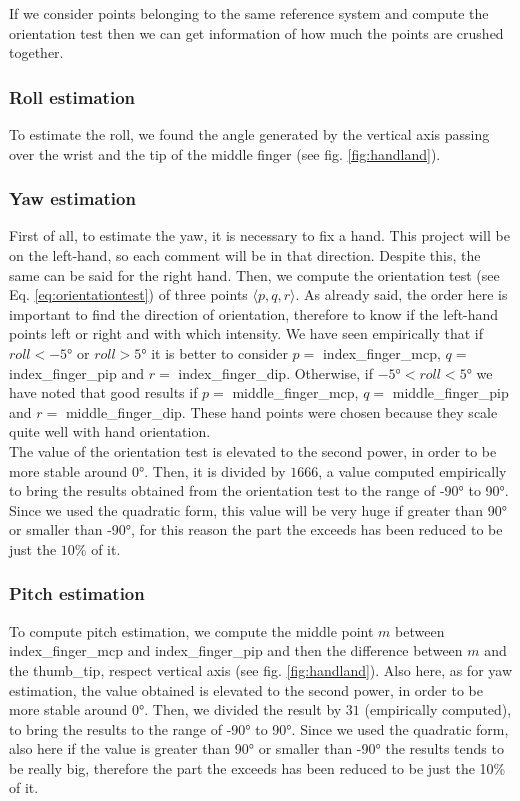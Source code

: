 \noindent If we consider points belonging to the same reference system and compute the orientation test then we can get information of how much the points are crushed together. 

\subsubsection{Roll estimation}
\label{subsec:roll}
To estimate the roll, we found the angle generated by the vertical axis passing over the wrist and the tip of the middle finger (see fig. \ref{fig:handland}).

\subsubsection{Yaw estimation}
\label{subsec:yaw}
First of all, to estimate the yaw, it is necessary to fix a hand. This project will be on the left-hand, so each comment will be in that direction. Despite this, the same can be said for the right hand. Then, we compute the orientation test (see Eq. \ref{eq:orientationtest}) of three points $\langle p, q, r \rangle$. As already said, the order here is important to find the direction of orientation, therefore to know if the left-hand points left or right and with which intensity. We have seen empirically that if $roll < \ang{-5}$ or $roll > \ang{+5}$ it is better to consider $p=$ index\_finger\_mcp, $q=$ index\_finger\_pip and $r=$ index\_finger\_dip. Otherwise, if $\ang{-5} < roll < \ang{+5}$ we have noted that good results if $p=$ middle\_finger\_mcp, $q=$ middle\_finger\_pip and $r=$ middle\_finger\_dip. These hand points were chosen because they scale quite well with hand orientation. \\

\noindent The value of the orientation test is elevated to the second power, in order to be more stable around \ang{0}. Then, it is divided by $1666$, a value computed empirically to bring the results obtained from the orientation test to the range of \ang{-90} to \ang{+90}. Since we used the quadratic form, this value will be very huge if greater than \ang{+90} or smaller than \ang{-90}, for this reason the part the exceeds has been reduced to be just the $10\%$ of it.

\subsubsection{Pitch estimation}
\label{subsec:pitch}
To compute pitch estimation, we compute the middle point $m$ between index\_finger\_mcp and index\_finger\_pip and then the difference between $m$ and the thumb\_tip, respect vertical axis (see fig. \ref{fig:handland}). Also here, as for yaw estimation, the value obtained is elevated to the second power, in order to be more stable around \ang{0}. Then, we divided the result by $31$ (empirically computed), to bring the results to the range of \ang{-90} to \ang{90}. Since we used the quadratic form, also here if the value is greater than \ang{90} or smaller than \ang{-90} the results tends to be really big, therefore the part the exceeds has been reduced to be just the 10\% of it.

